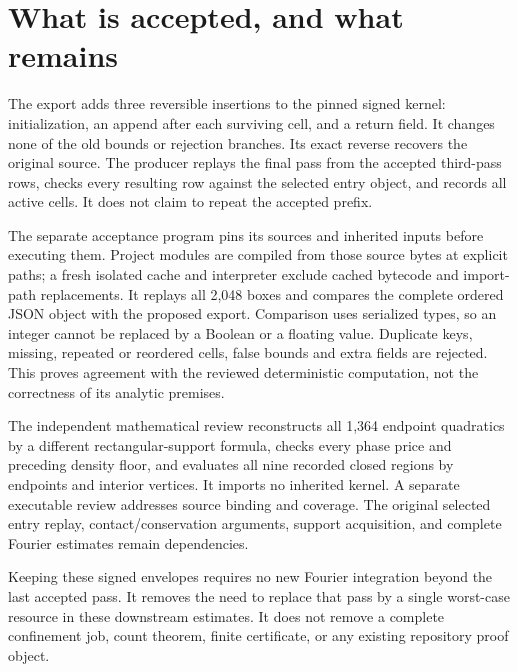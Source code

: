 \documentclass[11pt]{article}
\begin{document}
\section{What is accepted, and what remains}
The export adds three reversible insertions to the pinned signed kernel:
initialization, an append after each surviving cell, and a return field.
It changes none of the old bounds or rejection branches.
Its exact reverse recovers the original source.
The producer replays the final pass from the accepted third-pass rows,
checks every resulting row against the selected entry object, and records
all active cells. It does not claim to repeat the accepted prefix.

The separate acceptance program pins its sources and inherited inputs
before executing them. Project modules are compiled from those source
bytes at explicit paths; a fresh isolated cache and interpreter exclude
cached bytecode and import-path replacements. It replays all 2,048 boxes
and compares the complete
ordered JSON object with the proposed export. Comparison uses serialized
types, so an integer cannot be replaced by a Boolean or a floating value.
Duplicate keys, missing, repeated or reordered cells, false bounds and
extra fields are rejected. This proves agreement with the reviewed
deterministic computation, not the correctness of its analytic premises.

The independent mathematical review reconstructs all 1,364 endpoint
quadratics by a different rectangular-support formula, checks every phase
price and preceding density floor, and evaluates all nine recorded closed
regions by endpoints and interior vertices. It imports no inherited
kernel. A separate executable review addresses source binding and coverage.
The original selected entry replay, contact/conservation arguments,
support acquisition, and complete Fourier estimates remain dependencies.

Keeping these signed envelopes requires no new Fourier integration beyond
the last accepted pass. It removes the need to replace that pass by a
single worst-case resource in these downstream estimates. It does not
remove a complete confinement job, count theorem, finite certificate,
or any existing repository proof object.
\end{document}
